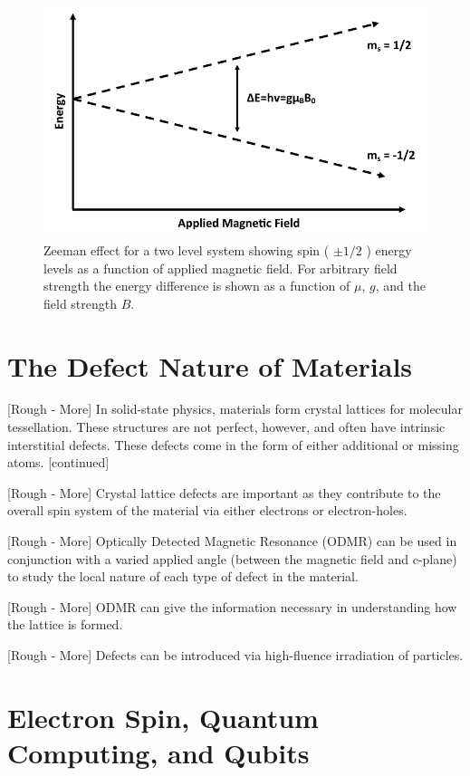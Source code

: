 \documentclass[oneside, astronomy, noacknowlegments]{BYUPhys}
\begin{document}
\begin{figure}
    \centerline{\includegraphics{zeeman_fig}}
    \caption[Zeeman effect and resonant conditions in matter]{\label{fig:Zeeman}
     Zeeman effect for a two level system showing spin ( $\pm 1/2$ ) energy levels as a function of applied magnetic field. For arbitrary field strength the energy difference is shown as a function of $\mu$, $g$, and the field strength $B$.}
\end{figure}

\section{The Defect Nature of Materials}

[Rough - More] In solid-state physics, materials form crystal lattices for molecular tessellation. These structures are not perfect, however, and often have intrinsic interstitial defects. These defects come in the form of either additional or missing atoms. [continued]

[Rough - More] Crystal lattice defects are important as they contribute to the overall spin system of the material via either electrons or electron-holes.

[Rough - More] Optically Detected Magnetic Resonance (ODMR) can be used in conjunction with a varied applied angle (between the magnetic field and c-plane) to study the local nature of each type of defect in the material.

[Rough - More] ODMR can give the information necessary in understanding how the lattice is formed.

[Rough - More] Defects can be introduced via high-fluence irradiation of particles.

\section{Electron Spin, Quantum Computing, and Qubits}
\end{document}
